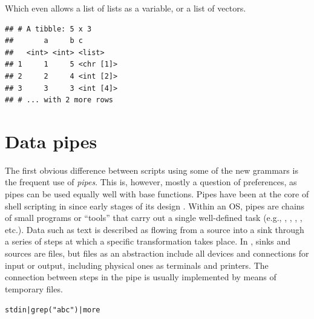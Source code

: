 \documentclass[krantz2]{krantz}\usepackage{knitr}
\begin{document}
Which even allows a list of lists as a variable, or a list of vectors.

\begin{knitrout}\footnotesize
{}\color{fgcolor}\begin{kframe}
\begin{alltt}
\hlstd{(} \hlstd{=} \hlopt{:}\hlstd{,}  \hlstd{=} \hlopt{:}\hlstd{,}  \hlstd{=} \hlstd{(}\hlstd{,} \hlopt{:}\hlstd{,} \hlopt{:}\hlstd{, letters[}\hlopt{:}\hlstd{], letters[}\hlopt{:}\hlstd{]))}
\end{alltt}
\begin{verbatim}
## # A tibble: 5 x 3
##       a     b c
##   <int> <int> <list>
## 1     1     5 <chr [1]>
## 2     2     4 <int [2]>
## 3     3     3 <int [4]>
## # ... with 2 more rows
\end{verbatim}
\end{kframe}
\end{knitrout}

\section{Data pipes}\label{sec:data:pipes}
The first obvious difference between scripts using some of the new grammars is the frequent use of \emph{pipes}. This is, however, mostly a question of preferences, as pipes can be used equally well with base \Rlang functions. Pipes have been at the core of shell scripting in  since early stages of its design \autocite{Kernigham1981}. Within an OS, pipes are chains of small programs or ``tools'' that carry out a single well-defined task (e.g., , , , , etc.). Data such as text is described as flowing from a source into a sink through a series of steps at which a specific transformation takes place. In , sinks and sources are files, but files as an abstraction include all devices and connections for input or output, including physical ones as terminals and printers. The connection between steps in the pipe is usually implemented by means of temporary files.

\begin{knitrout}\footnotesize
{}\color{fgcolor}\begin{kframe}
\begin{alltt}
stdin | grep("abc") | more
\end{alltt}
\end{kframe}
\end{knitrout}
\end{document}
